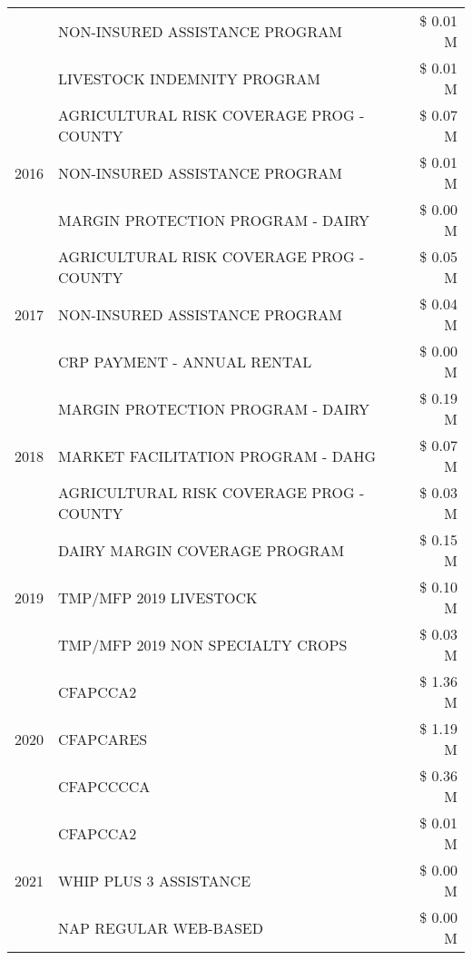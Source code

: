 \begin{tabular}{llr}
 & NON-INSURED ASSISTANCE PROGRAM & \$ 0.01 M \\
 & LIVESTOCK INDEMNITY PROGRAM & \$ 0.01 M \\
\cline{1-3}
\multirow[t]{3}{*}{2016} & AGRICULTURAL RISK COVERAGE PROG - COUNTY & \$ 0.07 M \\
 & NON-INSURED ASSISTANCE PROGRAM & \$ 0.01 M \\
 & MARGIN PROTECTION PROGRAM - DAIRY & \$ 0.00 M \\
\cline{1-3}
\multirow[t]{3}{*}{2017} & AGRICULTURAL RISK COVERAGE PROG - COUNTY & \$ 0.05 M \\
 & NON-INSURED ASSISTANCE PROGRAM & \$ 0.04 M \\
 & CRP PAYMENT - ANNUAL RENTAL & \$ 0.00 M \\
\cline{1-3}
\multirow[t]{3}{*}{2018} & MARGIN PROTECTION PROGRAM - DAIRY & \$ 0.19 M \\
 & MARKET FACILITATION PROGRAM - DAHG & \$ 0.07 M \\
 & AGRICULTURAL RISK COVERAGE PROG - COUNTY & \$ 0.03 M \\
\cline{1-3}
\multirow[t]{3}{*}{2019} & DAIRY MARGIN COVERAGE PROGRAM & \$ 0.15 M \\
 & TMP/MFP 2019 LIVESTOCK & \$ 0.10 M \\
 & TMP/MFP 2019 NON SPECIALTY CROPS & \$ 0.03 M \\
\cline{1-3}
\multirow[t]{3}{*}{2020} & CFAPCCA2 & \$ 1.36 M \\
 & CFAPCARES & \$ 1.19 M \\
 & CFAPCCCCA & \$ 0.36 M \\
\cline{1-3}
\multirow[t]{3}{*}{2021} & CFAPCCA2 & \$ 0.01 M \\
 & WHIP PLUS 3 ASSISTANCE & \$ 0.00 M \\
 & NAP REGULAR WEB-BASED & \$ 0.00 M \\
\cline{1-3}
\bottomrule
\end{tabular}
